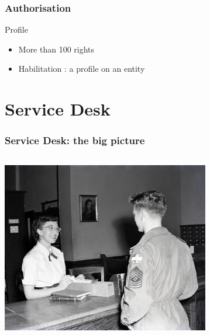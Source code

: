 \documentclass{beamer}
\begin{document}
\begin{frame}
\frametitle{Authorisation}
    \begin{block}{Profile}
        \begin{itemize}
            \item More than 100 rights
            \item Habilitation : a profile on an entity
        \end{itemize}
    \end{block}
\end{frame}


\section{Service Desk}

\begin{frame}
\frametitle{Service Desk: the big picture}
\begin{columns}
\begin{column}{0.45\textwidth}
\includegraphics[height=7.5cm]{./pics/servicedesk.jpg}
\end{column}
\begin{column}{0.45\textwidth}
\end{column}
\end{columns}
\end{frame}
\end{document}
